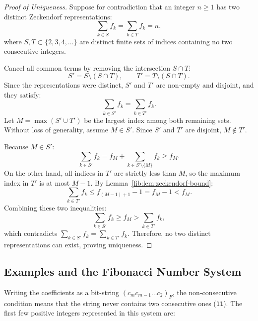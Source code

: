 \documentclass[a4paper]{article}
\begin{document}
\begin{proof}[Proof of Uniqueness]
Suppose for contradiction that an integer $n \geq 1$ has two distinct Zeckendorf representations:
\begin{equation*}
\sum_{k \in S} f_k = \sum_{k \in T} f_k = n,
\end{equation*}
where $S, T \subset \{2, 3, 4, \dots\}$ are distinct finite sets of indices containing no two consecutive integers.

Cancel all common terms by removing the intersection $S \cap T$:
\begin{equation*}
S' = S \setminus (S \cap T), \qquad T' = T \setminus (S \cap T).
\end{equation*}
Since the representations were distinct, $S'$ and $T'$ are non-empty and disjoint, and they satisfy:
\begin{equation*}
\sum_{k \in S'} f_k = \sum_{k \in T'} f_k.
\end{equation*}
Let $M = \max(S' \cup T')$ be the largest index among both remaining sets. Without loss of generality, assume $M \in S'$. Since $S'$ and $T'$ are disjoint, $M \notin T'$.

Because $M \in S'$:
\begin{equation*}
\sum_{k \in S'} f_k = f_M + \sum_{k \in S' \setminus \{M\}} f_k \geq f_M.
\end{equation*}
On the other hand, all indices in $T'$ are strictly less than $M$, so the maximum index in $T'$ is at most $M - 1$. By Lemma~\ref{fib:lem:zeckendorf-bound}:
\begin{equation*}
\sum_{k \in T'} f_k \leq f_{(M-1)+1} - 1 = f_M - 1 < f_M.
\end{equation*}
Combining these two inequalities:
\begin{equation*}
\sum_{k \in S'} f_k \geq f_M > \sum_{k \in T'} f_k,
\end{equation*}
which contradicts $\sum_{k \in S'} f_k = \sum_{k \in T'} f_k$. Therefore, no two distinct representations can exist, proving uniqueness.
\end{proof}

\subsection{Examples and the Fibonacci Number System}
Writing the coefficients as a bit-string $(c_m c_{m-1} \dots c_2)_F$, the non-consecutive condition means that the string never contains two consecutive ones (\texttt{11}). The first few positive integers represented in this system are:
\end{document}
